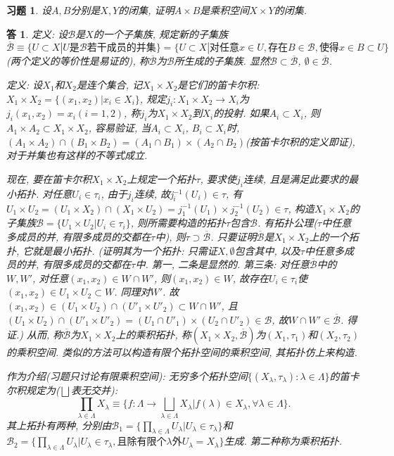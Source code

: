 \documentclass{ctexart}%
\newtheorem*{exercise}{习题}
\newtheorem*{solution}{答}
\theoremstyle{definition}
\theoremstyle{remark}
\begin{document}
\begin{exercise}设$A,B$分别是$X,Y$的闭集, 证明$A\times B$是乘积空间$X\times Y$的闭集.
\end{exercise}
\begin{solution}
定义: 设$\mathscr{B}$是$X$的一个子集族, 规定新的子集族$\overline{\mathscr{B}}\equiv \{U\subset X|U\text{是}\mathscr{B}\text{若干成员的并集}\}=\{U\subset X|\text{对任意}x\in U,\text{存在}B\in \mathscr{B}, \text{使得}x\in B\subset U\}$(两个定义的等价性是易证的), 称$\overline{\mathscr{B}}$为$\mathscr{B}$所生成的子集族. 显然$\mathscr{B}\subset \overline{\mathscr{B}}$, $\emptyset\in \overline{\mathscr{B}}$. 

定义: 设$X_1$和$X_2$是连个集合, 记$X_1\times X_2$是它们的笛卡尔积: $X_1\times X_2=\{(x_1,x_2)|x_i\in
 X_i\}$, 规定$j_i: X_1\times X_2 \rightarrow X_i$为$j_i(x_1,x_2)=x_i(i=1,2)$, 称$j_i$为$X_1\times X_2$到$X_i$的投射. 如果$A_i\subset X_i$, 则$A_1\times A_2\subset X_1\times X_2$, 容易验证, 当$A_i\subset X_i$, $B_i\subset X_i$时, $(A_1\times A_2)\cap (B_1\times B_2)=(A_1\cap B_1)\times(A_2\cap B_2)$(按笛卡尔积的定义即证), 对于并集也有这样的不等式成立.
 
现在, 要在笛卡尔积$X_1\times X_2$上规定一个拓扑$\tau$, 要求使$j_i$连续, 且是满足此要求的最小拓扑. 对任意$U_i\in \tau_i$, 由于$j_i$连续, 故j$^{-1}_i(U_i)\in \tau$, 有$U_1\times U_2=(U_1\times X_2)\cap (X_1\times U_2)=j^{-1}_1(U_1)\times j^{-1}_2(U_2)\in \tau$, 构造$X_1\times X_2$的子集族$\mathscr{B}=\{U_1\times U_2|U_i\in \tau_i\}$, 则所需要构造的拓扑$\tau$包含$\mathscr{B}$. 有拓扑公理($\tau$中任意多成员的并, 有限多成员的交都在$\tau$中), 则$\tau\supset \overline{\mathscr{B}}$. 只要证明$\overline{\mathscr{B}}$是$X_1\times X_2$上的一个拓扑, 它就是最小拓扑. (证明其为一个拓扑: 只需证$X,\emptyset$包含其中, 以及$\tau$中任意多成员的并, 有限多成员的交都在$\tau$中. 第一, 二条是显然的. 第三条: 对任意$\overline{\mathscr{B}}$中的$W, W'$, 对任意$(x_1,x_2)\in W\cap W'$, 则$(x_1,x_2)\in W$, 故存在$U_i\in \tau_i$使$(x_1,x_2)\in U_1\times U_2 \subset W$. 同理对$W'$. 故 $(x_1,x_2)\in (U_1\times U_2)\cap(U'_1\times U'_2)\subset W\cap W'$, 且$(U_1\times U_2)\cap (U'_1\times U'_2)=(U_1\cap U'_1)\times (U_2\cap U'_2) \in \mathscr{B}$, 故$W\cap W' \in \overline{\mathscr{B}}$. 得证.) 从而, 称$\overline{\mathscr{B}}$为$X_1\times X_2$上的乘积拓扑, 称$(X_1\times X_2,\overline{\mathscr{B}})$为$(X_1,\tau_1)$和$(X_2,\tau_2)$的乘积空间. 类似的方法可以构造有限个拓扑空间的乘积空间, 其拓扑仿上来构造. 

作为介绍(习题只讨论有限乘积空间): 无穷多个拓扑空间$\{(X_\lambda,\tau_\lambda):\lambda\in \Lambda\}$的笛卡尔积规定为($\bigsqcup$表无交并):
$$\prod\limits_{\lambda\in \Lambda} X_\lambda \equiv \{f: \Lambda \rightarrow \bigsqcup\limits_{\lambda\in \Lambda} X_\lambda|f(\lambda) \in X_\lambda, \forall \lambda \in \Lambda\}.$$其上拓扑有两种, 分别由$\mathscr{B}_1=\{\prod_{\lambda\in \Lambda} U_\lambda|U_\lambda\in \tau_\lambda\}$和$\mathscr{B}_2=\{\prod_{\lambda\in \Lambda} U_\lambda|U_\lambda\in \tau_\lambda, \text{且除有限个}\lambda\text{外} U_\lambda = X_\lambda\}$生成. 第二种称为乘积拓扑.


\end{solution}
\end{document}
